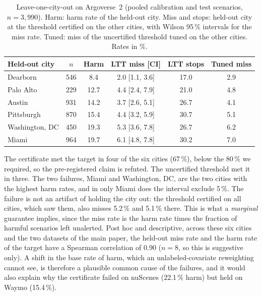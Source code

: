 \documentclass[lettersize,journal]{IEEEtran}
\begin{document}
\begin{table}[h]
\caption{Leave-one-city-out on Argoverse~2 (pooled calibration and test
scenarios, $n = 3{,}990$). Harm: harm rate of the held-out city. Miss and
stops: held-out city at the threshold certified on the other cities, with
Wilson 95\,\% intervals for the miss rate. Tuned: miss of the uncertified
threshold tuned on the other cities. Rates in \%.}
\label{tab:city}
\centering
\scriptsize\setlength{\tabcolsep}{2.5pt}
\begin{tabular}{lccccc}
\toprule
Held-out city & $n$ & Harm & LTT miss [CI] & LTT stops & Tuned miss \\
\midrule
Dearborn & 546 & 8.4 & 2.0 [1.1, 3.6] & 17.0 & 2.9 \\
Palo Alto & 229 & 12.7 & 4.4 [2.4, 7.9] & 21.0 & 4.8 \\
Austin & 931 & 14.2 & 3.7 [2.6, 5.1] & 26.7 & 4.1 \\
Pittsburgh & 870 & 15.4 & 4.4 [3.2, 5.9] & 30.7 & 5.1 \\
Washington, DC & 450 & 19.3 & 5.3 [3.6, 7.8] & 26.7 & 6.2 \\
Miami & 964 & 19.7 & 6.1 [4.8, 7.8] & 30.2 & 7.0 \\
\bottomrule
\end{tabular}
\end{table}

The certificate met the target in four of the six cities (67\,\%), below
the 80\,\% we required, so the pre-registered claim is refuted. The
uncertified threshold met it in three. The two failures, Miami and
Washington, DC, are the two cities with the highest harm rates, and in
only Miami does the interval exclude 5\,\%. The failure is not an artifact
of holding the city out: the threshold certified on all cities, which
saw them, also misses 5.2\,\% and 5.1\,\% there. This is what a
\emph{marginal} guarantee implies, since the miss rate is the harm rate
times the fraction of harmful scenarios left unalerted. Post hoc and
descriptive, across these six cities and the two datasets of the main
paper, the held-out miss rate and the harm rate of the target have a
Spearman correlation of 0.90 ($n = 8$, so this is suggestive only). A
shift in the base rate of harm, which an unlabeled-covariate reweighting
cannot see, is therefore a plausible common cause of the failures, and
it would also explain why the certificate failed on nuScenes (22.1\,\%
harm) but held on Waymo (15.4\,\%).
\end{document}
